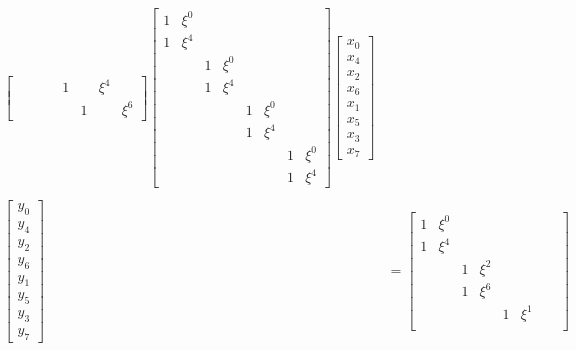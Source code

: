 \documentclass{jsarticle}
\begin{document}
\begin{align*}
\begin{bmatrix}
      &   &       &       & 1 &   & \xi^4 &       \\
      &   &       &       &   & 1 &       & \xi^6
  \end{bmatrix}
  \begin{bmatrix}
    1 & \xi^0 &   &       &   &       &   &       \\
    1 & \xi^4 &   &       &   &       &   &       \\
      &       & 1 & \xi^0 &   &       &   &       \\
      &       & 1 & \xi^4 &   &       &   &       \\
      &       &   &       & 1 & \xi^0 &   &       \\
      &       &   &       & 1 & \xi^4 &   &       \\
      &       &   &       &   &       & 1 & \xi^0 \\
      &       &   &       &   &       & 1 & \xi^4
  \end{bmatrix}
  \begin{bmatrix}
    x_0 \\
    x_4 \\
    x_2 \\
    x_6 \\
    x_1 \\
    x_5 \\
    x_3 \\
    x_7
  \end{bmatrix}
  \tag{1}
  \\
  \\
  \begin{bmatrix}
    y_0 \\
    y_4 \\
    y_2 \\
    y_6 \\
    y_1 \\
    y_5 \\
    y_3 \\
    y_7
  \end{bmatrix}
  &=
  \begin{bmatrix}
    1 & \xi^0 &   &       &   &       &   &       \\
    1 & \xi^4 &   &       &   &       &   &       \\
      &       & 1 & \xi^2 &   &       &   &       \\
      &       & 1 & \xi^6 &   &       &   &       \\
      &       &   &       & 1 & \xi^1 &   &       \\

\end{bmatrix}
\end{align*}
\end{document}
